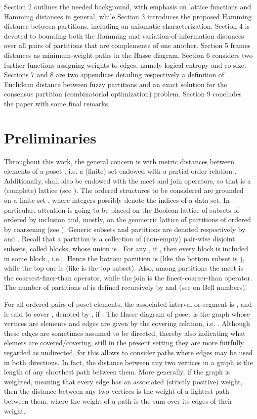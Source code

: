 \documentclass[a4paper,10pt]{article}
\begin{document}
Section 2 outlines the needed background, with emphasis on lattice functions and Hamming distances in general, while Section 3 introduces the proposed Hamming distance between
partitions, including an axiomatic characterization. Section 4 is devoted to bounding both the Hamming and variation-of-information distances over all pairs of partitions that
are complements of one another. Section 5 frames distances as minimum-weight paths in the Hasse diagram. Section 6 considers two further functions assigning weights to edges,
namely logical entropy and co-size. Sections 7 and 8 are two appendices detailing respectively a definition of Euclidean distance between fuzzy partitions and an exact
solution for the consensus partition (combinatorial optimization) problem. Section 9 concludes the paper with some final remarks.


\section{Preliminaries}
Throughout this work, the general concern is with metric distances  between elements  of a poset , i.e. a (finite) set  endowed with a
partial order relation . Additionally,  shall also be endowed with the meet  and join  operators, so that  is a (complete) lattice
(see \cite{DaveyPriestley}). The ordered structures to be considered are grounded on a finite set , where integers  possibly denote the indices
of a data set. In particular, attention is going to be placed on the Boolean lattice  of subsets of  ordered by inclusion  and, mostly, on the
geometric lattice  of partitions of  ordered by coarsening  (see \cite{Aigner79,Stern99}). Generic subsets and partitions are denoted
respectively by  and . Recall that a partition  is a collection of (non-empty) pair-wise disjoint subsets, called
blocks, whose union is . For any , if , then every block  is included in some block , i.e. . Hence the bottom
partition is  (like the bottom subset is ), while the top one is  (like  is the top subset). Also, among
partitions the meet  is the coarsest-finer-than operator, while the join  is the finest-coarser-than operator. The number  of
partitions of  is defined recursively by  and  (see \cite{Aigner79,GrahamKnuth+1994,Rota1964} on
Bell numbers).

For all ordered pairs  of poset elements, the associated interval or segment is , and  is said to cover ,
denoted by , if . The Hasse diagram of poset  is the graph  whose vertices are elements  and edges are given by the covering
relation, i.e. . Although these edges are sometimes assumed to be directed, thereby also indicating what elemets are covered/covering, still in the
present setting they are more fuitfully regarded as undirected, for this allows to consider paths where edges may be used in both directions. In fact, the distance between any
two vertices in a graph is the length of any shorthest path between them. More generally, if the graph is weighted, meaning that every edge has an associated (strictly positive)
weight, then the distance between any two vertices is the weight of a lightest path between them, where the weight of a path is the sum over its edges of their weight.
\end{document}
